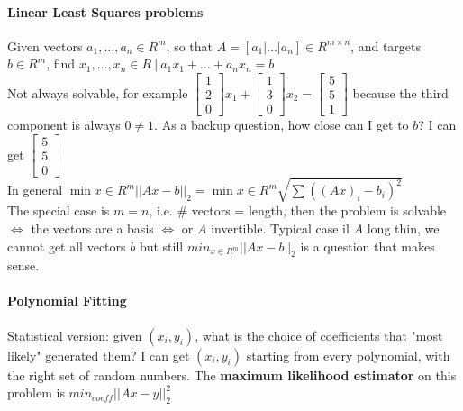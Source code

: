 \documentclass[10pt]{report}
\begin{document}
\paragraph{Linear Least Squares problems} Given vectors $a_1,\ldots,a_n\in R^m$, so that $A = [a_1|\ldots|a_n]\in R^{m\times n}$, and targets $b\in R^m$, find $x_1,\ldots,x_n\in R\:|\: a_1x_1 + \ldots + a_n x_n = b$\\
Not always solvable, for example $\left[\begin{array}{c}
1\\2\\0
\end{array}\right]x_1 + \left[\begin{array}{c}
1\\3\\0
\end{array}\right]x_2 = \left[\begin{array}{c}
5\\5\\1
\end{array}\right]$ because the third component is always $0 \neq 1$. As a backup question, how close can I get to $b$? I can get $\left[\begin{array}{c}
5\\5\\0
\end{array}\right]$\\
In general $\min{x\in R^m} ||Ax - b||_2 = \min{x\in R^m} \sqrt{\sum ((Ax)_i - b_i)^2}$\\
The special case is $m=n$, i.e. \# vectors = length, then the problem is solvable $\Leftrightarrow$ the vectors are a basis $\Leftrightarrow$ or $A$ invertible. Typical case il $A$ long thin, we cannot get all vectors $b$ but still $min_{x\in R^m} ||Ax - b||_2$ is a question that makes sense. 
\paragraph{Polynomial Fitting} Statistical version: given $(x_i, y_i)$, what is the choice of coefficients that "most likely" generated them? I can get $(x_i, y_i)$ starting from every polynomial, with the right set of random numbers. The \textbf{maximum likelihood estimator} on this problem is $min_{coeff}||Ax - y||_2^2$
\end{document}
